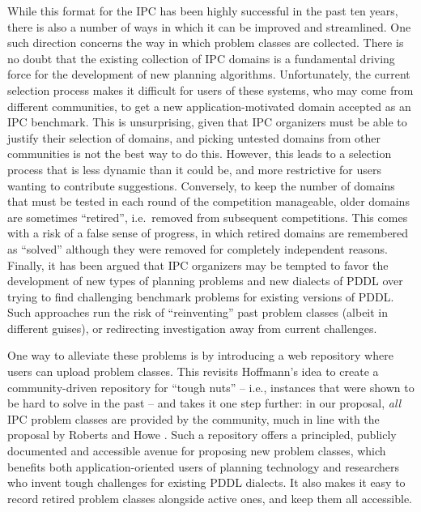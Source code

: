 While this format for the IPC has been highly successful in the past
ten years, there is also a number of ways in which it can be improved
and streamlined.  One such direction concerns the way in which problem
classes are collected.  There is no doubt that the existing collection
of IPC domains is a fundamental driving force for the development of
new planning algorithms.  Unfortunately, the current selection process
makes it difficult for users of these systems, who may come from
different communities, to get a new application-motivated domain
accepted as an IPC benchmark.  This is unsurprising, given that IPC
organizers must be able to justify their selection of domains, and
picking untested domains from other communities is not the best way to
do this.  However, this leads to a selection process that is less
dynamic than it could be, and more restrictive for users wanting to
contribute suggestions.  Conversely, to keep the number of domains
that must be tested in each round of the competition manageable, older
domains are sometimes ``retired'', i.e.\ removed from subsequent
competitions.  This comes with a risk of a false sense of progress, in
which retired domains are remembered as ``solved'' although they were
removed for completely independent reasons.  Finally, it has been
argued \cite{ToughNuts} that IPC organizers may be tempted to favor
the development of new types of planning problems and new dialects of
PDDL over trying to find challenging benchmark problems for existing
versions of PDDL. Such approaches run the risk of ``reinventing'' past
problem classes (albeit in different guises), or redirecting
investigation away from current challenges.

One way to alleviate these problems is by introducing a web repository
where users can upload problem classes. This revisits Hoffmann's
 idea to create a community-driven repository for
``tough nuts'' -- i.e., instances that were shown to be hard to solve in
the past -- and takes it one step further: in our proposal, \emph{all} IPC
problem classes are provided by the community, much in line with the
proposal by Roberts and Howe . Such a
repository offers a principled, publicly documented and accessible avenue
for proposing new problem classes, which benefits both application-oriented
users of planning technology and researchers who invent tough challenges
for existing PDDL dialects. It also makes it easy to record retired problem
classes alongside active ones, and keep them all accessible.

